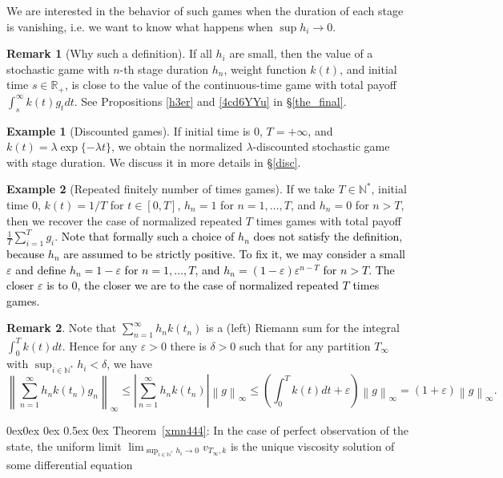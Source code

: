 \documentclass[english,openary,12pt]{article}
\makeatletter
\renewcommand\subsection{\@startsection{subsection}{2}{\z@}%
                                     {0ex\@plus 0ex \@minus 0ex}%
                                     {0.5ex \@plus 0ex}%
                                     {\normalfont\Large\bfseries}}%
\newcommand{\red}[1]{\textcolor{black}{#1}}
\theoremstyle{definition}
\newtheorem{remark}{Remark}
\newtheorem{example}{Example}
\newcommand{\R}{\mathbb{R}}
\newcommand{\N}{\mathbb{N}}
\makeatother
\begin{document}
We are interested in the behavior of such games when the duration of each stage is vanishing, i.e. we want to know what happens when $\sup h_i \to 0$.

\begin{remark}[Why such a definition]
	If all $h_i$ are small, then the value of a stochastic game with $n$-th stage duration $h_n$, weight function $k(t)$, and initial time $s \in \R_+$, is close to the value of	the continuous-time game with total payoff $\int_s^\infty k(t) g_t dt$. See Propositions \ref{h3er} and \ref{4cd6YYu} in \S\ref{the_final}.
\end{remark}

\begin{example}[Discounted games]
If initial time is $0$, $T=+\infty$, and $k(t) = \lambda \exp\{-\lambda t\}$,  we obtain the normalized $\lambda$-discounted stochastic game with stage duration. We discuss it in more details in \S\ref{disc}.
\end{example}

\begin{example}[Repeated finitely number of times games]
If we take $T \in \N^*$, initial time $0$, $k(t) = 1/T$ for $t\in [0,T]$, $h_n = 1$ for $n = 1, \ldots, T$, and $h_n = 0$ for $n > T$, then we recover the case of normalized repeated $T$ times games with total payoff $\frac{1}{T}\sum_{i = 1}^T g_i$. \red{Note that formally such a choice of $h_n$ does not satisfy the definition, because $h_n$ are assumed to be strictly positive. To fix it, we may consider a small $\varepsilon$ and define $h_n = 1 - \varepsilon$ for $n = 1, \ldots, T$, and $h_n = (1-\varepsilon) \varepsilon^{n-T}$ for $n > T$. The closer $\varepsilon$ is to $0$, the closer we are to the case of normalized repeated $T$ times games.}
\end{example}

\begin{remark}
\label{important}
Note that
$\sum\nolimits_{n = 1}^\infty h_n k(t_n)$
is a (left) Riemann sum for the integral
$\int_{0}^T k(t) dt.$
Hence for any $\varepsilon > 0$ there is $\delta > 0$ such that for any
partition $T_\infty$ with $\sup_{i\in\N^*} h_i < \delta$, we have
$$\left\|\sum_{n = 1}^\infty h_n k(t_n) g_n\right\|_\infty \le
\left|\sum_{n = 1}^\infty h_n k(t_n)\right| 
\left\|g\right\|_\infty \le
\left(\int_{0}^T k(t) dt + \varepsilon\right) \left\|g\right\|_\infty = 
(1+\varepsilon) \left\|g\right\|_\infty.$$
\end{remark}

\subsection{Theorem~\ref{xmn444}: In the case of perfect observation of the state, the uniform limit 
$\lim_{\sup_{i\in\N^*} h_i \to 0} v_{T_\infty,k}$ 
is the unique viscosity solution of some differential equation}
\label{ther5}
\end{document}
